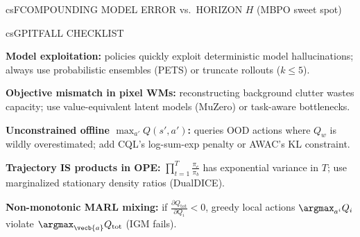 \documentclass[../../../../master.tex]{subfiles}
\begin{document}
\begin{cscolumns}
\begin{cscard}{csF}{COMPOUNDING MODEL ERROR vs.\ HORIZON $H$ (MBPO sweet spot)}
  \centering
\end{cscard}
\columnbreak

\begin{cscard}{csG}{PITFALL CHECKLIST}
  \begin{csbul}
    \item \textbf{Model exploitation:} policies quickly exploit deterministic model hallucinations; always use probabilistic ensembles (PETS) or truncate rollouts ($k\le 5$).
    \item \textbf{Objective mismatch in pixel WMs:} reconstructing background clutter wastes capacity; use value-equivalent latent models (MuZero) or task-aware bottlenecks.
    \item \textbf{Unconstrained offline $\max_{a'}Q(s',a')$:} queries OOD actions where $Q_w$ is wildly overestimated; add CQL's log-sum-exp penalty or AWAC's KL constraint.
    \item \textbf{Trajectory IS products in OPE:} $\prod_{t=1}^T \frac{\pi_e}{\pi_b}$ has exponential variance in $T$; use marginalized stationary density ratios (DualDICE).
    \item \textbf{Non-monotonic MARL mixing:} if $\frac{\partial Q_{\mathrm{tot}}}{\partial Q_i}<0$, greedy local actions $\argmax_{a^i} Q_i$ violate $\argmax_{\vecb{a}} Q_{\mathrm{tot}}$ (IGM fails).
  \end{csbul}
\end{cscard}


\end{cscolumns}
\end{document}
